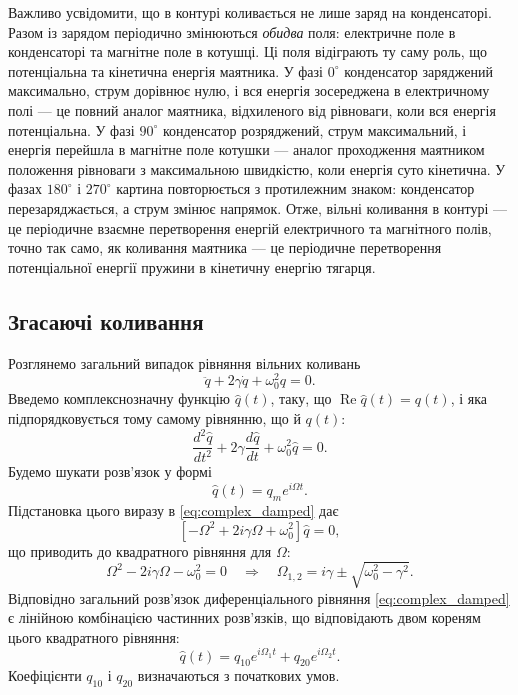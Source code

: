 Важливо усвідомити, що в контурі коливається не лише заряд на
конденсаторі. Разом із зарядом періодично змінюються \emph{обидва}
поля: електричне поле в конденсаторі та магнітне поле в котушці. Ці
поля відіграють ту саму роль, що потенціальна та кінетична енергія
маятника. У фазі $0^\circ$ конденсатор заряджений максимально, струм
дорівнює нулю, і вся енергія зосереджена в електричному полі --- це
повний аналог маятника, відхиленого від рівноваги, коли вся енергія
потенціальна. У фазі $90^\circ$ конденсатор розряджений, струм
максимальний, і енергія перейшла в магнітне поле котушки --- аналог
проходження маятником положення рівноваги з максимальною швидкістю,
коли енергія суто кінетична. У фазах $180^\circ$ і $270^\circ$ картина
повторюється з протилежним знаком: конденсатор перезаряджається, а
струм змінює напрямок. Отже, вільні коливання в контурі --- це
періодичне взаємне перетворення енергій електричного та магнітного
полів, точно так само, як коливання маятника --- це періодичне
перетворення потенціальної енергії пружини в кінетичну енергію
тягарця.

\subsection*{Згасаючі коливання}

Розглянемо загальний випадок рівняння вільних коливань
\begin{equation}\label{eq:damped_equation}
	\ddot{q} + 2\gamma\dot{q} + \omega_0^2 q = 0.
\end{equation}
Введемо комплекснозначну функцію $\hat{q}(t)$, таку, що $\operatorname{Re}\hat{q}(t) = q(t)$, і
яка підпорядковується тому самому рівнянню, що й $q(t)$:
\begin{equation}\label{eq:complex_damped}
	\frac{d^2\hat{q}}{dt^2} + 2\gamma\frac{d\hat{q}}{dt} + \omega_0^2\hat{q} = 0.
\end{equation}
Будемо шукати розв'язок у формі
\begin{equation}\label{eq:complex_ansatz}
	\hat{q}(t) = q_m e^{i\Omega t}.
\end{equation}
Підстановка цього виразу в \eqref{eq:complex_damped} дає
\begin{equation}\label{eq:characteristic}
	\left[-\Omega^2 + 2i\gamma\Omega + \omega_0^2\right]\hat{q} = 0,
\end{equation}
що приводить до квадратного рівняння для $\Omega$:
\begin{equation}\label{eq:Omega_roots}
	\Omega^2 - 2i\gamma\Omega - \omega_0^2 = 0
	\quad\Rightarrow\quad
	\Omega_{1,2} = i\gamma \pm \sqrt{\omega_0^2 - \gamma^2}.
\end{equation}
Відповідно загальний розв'язок диференціального рівняння \eqref{eq:complex_damped}
є лінійною комбінацією частинних розв'язків, що відповідають двом кореням
цього квадратного рівняння:
\begin{equation}\label{eq:general_solution}
	\hat{q}(t) = q_{10} e^{i\Omega_1 t} + q_{20} e^{i\Omega_2 t}.
\end{equation}
Коефіцієнти $q_{10}$ і $q_{20}$ визначаються з початкових умов.

